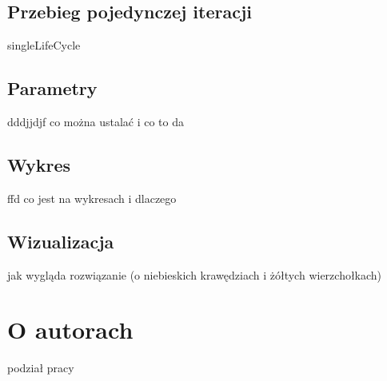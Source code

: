 \documentclass[11pt]{aghdpl}
\begin{document}
\section{Przebieg pojedynczej iteracji}
\label{sec:singleLifeCycle}
singleLifeCycle
\section{Parametry}
\label{sec:params}
dddjjdjf
co można ustalać i co to da
\section{Wykres}
\label{sec:chart}
ffd
co jest na wykresach i dlaczego
\section{Wizualizacja}
\label{sec:visualization}
jak wygląda rozwiązanie (o niebieskich krawędziach i żółtych wierzchołkach)

\chapter{O autorach} 
\label{cha:aboutAut}
podział pracy


%
%



% 
% 

%
%
%
%
%
%
\end{document}
